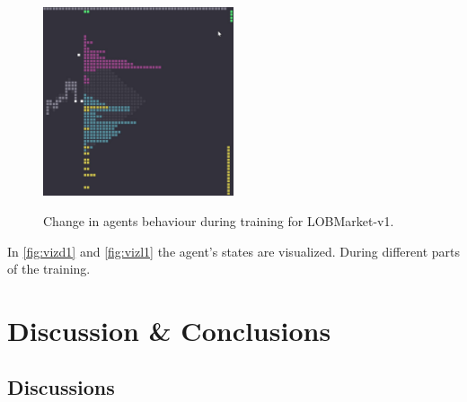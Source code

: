 \documentclass{kththesis}
\theoremstyle{definition}
\begin{document}
\begin{figure}[H]
{\includegraphics[width=0.5\textwidth]{LOBMarket_eps363_lstm.jpg}
\label{fig:svl4}}
\caption{Change in agents behaviour during training for LOBMarket-v1.}
\label{fig:vizl1}
\end{figure}
In \autoref{fig:vizd1} and \autoref{fig:vizl1} the agent's states are visualized. During different parts of the training.



\chapter{Discussion \& Conclusions}\label{ch:7}

\section{Discussions}
\end{document}

